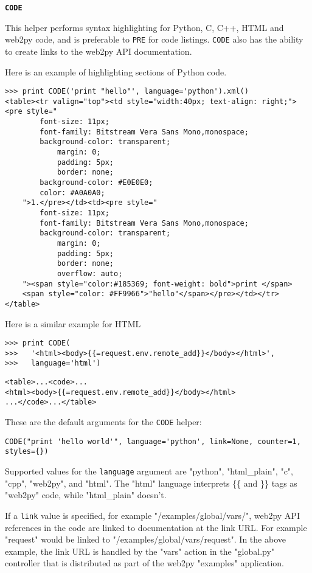 \documentclass[justified,sixbynine,notoc]{tufte-book}
\def\ft{\small\tt}
\def\inxx#1{\index{#1}}
\begin{document}
\begin{fullwidth}
{\bf {\ft CODE}}

\inxx{CODE}

This helper performs syntax highlighting for Python, C, C++, HTML and web2py code, and is preferable to {\ft PRE} for code listings. {\ft CODE} also has the ability to create links to the web2py API documentation.

Here is an example of highlighting sections of Python code.
\begin{lstlisting}
>>> print CODE('print "hello"', language='python').xml()
<table><tr valign="top"><td style="width:40px; text-align: right;"><pre style="
        font-size: 11px;
        font-family: Bitstream Vera Sans Mono,monospace;
        background-color: transparent;
            margin: 0;
            padding: 5px;
            border: none;
        background-color: #E0E0E0;
        color: #A0A0A0;
    ">1.</pre></td><td><pre style="
        font-size: 11px;
        font-family: Bitstream Vera Sans Mono,monospace;
        background-color: transparent;
            margin: 0;
            padding: 5px;
            border: none;
            overflow: auto;
    "><span style="color:#185369; font-weight: bold">print </span>
    <span style="color: #FF9966">"hello"</span></pre></td></tr>
</table>
\end{lstlisting}

Here is a similar example for HTML
\begin{lstlisting}
>>> print CODE(
>>>   '<html><body>{{=request.env.remote_add}}</body></html>',
>>>   language='html')
\end{lstlisting}
\begin{lstlisting}[keywords={}]
<table>...<code>...
<html><body>{{=request.env.remote_add}}</body></html>
...</code>...</table>
\end{lstlisting}

These are the default arguments for the {\ft CODE} helper:
\begin{lstlisting}
CODE("print 'hello world'", language='python', link=None, counter=1, styles={})
\end{lstlisting}

Supported values for the {\ft language} argument are "python", "html\_plain", "c", "cpp", "web2py", and "html". The "html" language interprets \{\{ and \}\} tags as "web2py" code, while "html\_plain" doesn't.

If a {\ft link} value is specified, for example "/examples/global/vars/", web2py API references in the code are linked to documentation at the link URL. For example "request" would be linked to "/examples/global/vars/request". In the above example, the link URL is handled by the "vars" action in the "global.py" controller that is distributed as part of the web2py "examples" application.


\end{fullwidth}
\end{document}
